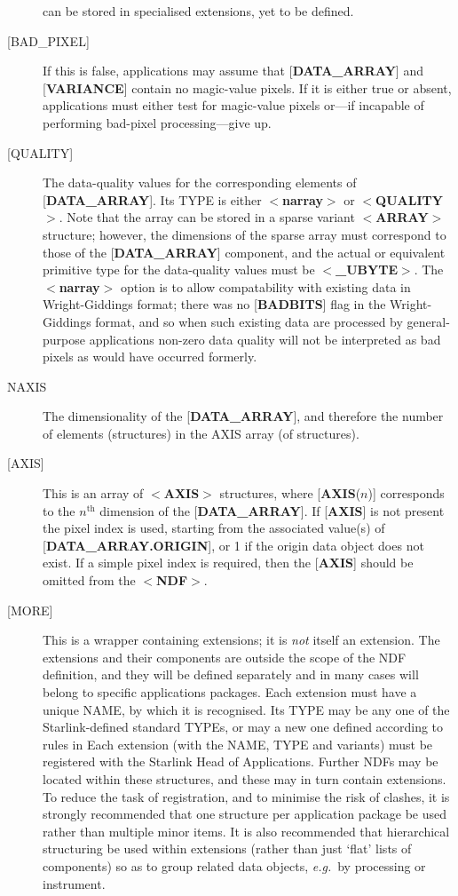 \documentclass[twoside,11pt,nolof,noabs]{starlink}
\begin{document}
\begin{description}
can be stored in specialised extensions, yet to be defined.
\item [{[}BAD\_PIXEL{]}]  If this
is false, applications may assume that
{[}\textbf{DATA\_ARRAY}{]} and {[}\textbf{VARIANCE}{]} contain no magic-value
pixels. If it is either true or absent, applications
must either test for magic-value pixels or---if incapable
of performing bad-pixel processing---give up.
\item [{[}QUALITY{]}]  The data-quality values for the
corresponding elements of {[}\textbf{DATA\_ARRAY}{]}.
Its TYPE is either $<$\textbf{narray}$>$ or $<$\textbf{QUALITY}$>$.
Note that the array can be stored
in a sparse variant \mbox{$<$\textbf{ARRAY}$>$} structure;
however, the dimensions of the sparse array must correspond to those of the
{[}\textbf{DATA\_ARRAY}{]} component, and the actual or equivalent
primitive type for the data-quality values must be $<$\textbf{\_UBYTE}$>$.
The $<$\textbf{narray}$>$ option is to allow compatability with existing data in
Wright-Giddings format; there was no
{[}\textbf{BADBITS}{]} flag in the Wright-Giddings format,
and so when such existing data are processed by
general-purpose applications
non-zero data quality will not be interpreted as
bad pixels as would have occurred formerly.
\item [NAXIS]  The dimensionality of
the {[}\textbf{DATA\_ARRAY}{]}, and therefore
the number of elements (structures) in the AXIS array
(of structures).
\item [{[}AXIS{]}] This is an array of $<$\textbf{AXIS}$>$ structures, where
{[}\textbf{AXIS}($n$){]} corresponds to the $n^{\mathrm{th}}$ dimension of the
{[}\textbf{DATA\_ARRAY}{]}.
If {[}\textbf{AXIS}{]} is not present the pixel index is used, starting
from the associated value(s) of {[}\textbf{DATA\_ARRAY.ORIGIN}{]}, or 1 if the
origin data object does not exist. If a simple pixel index is required,
then the {[}\textbf{AXIS}{]} should be omitted from the $<$\textbf{NDF}$>$.
\item [{[}MORE{]}]  This is a wrapper containing extensions; it is \emph{not} itself an extension. The extensions and their components
are outside the scope of the NDF definition, and they will
be defined separately and in many cases will belong
to specific applications packages.
Each extension must have a unique NAME, by which it is recognised.
Its TYPE may be any one of the Starlink-defined standard TYPEs, or
may a new one defined according to rules in
Each extension (with the NAME, TYPE and variants)
must be registered with the Starlink Head of Applications.
Further NDFs may be located within these structures, and these
may in turn contain extensions.  To reduce the task of registration,
and to minimise the risk of clashes, it is strongly recommended
that one structure per application package be used rather than multiple
minor items. It is also recommended that hierarchical structuring be used
within extensions (rather than just `flat' lists of components)
so as to group related data objects, \textit{e.g.}\  by
processing or instrument.
\end{description}
\end{document}
